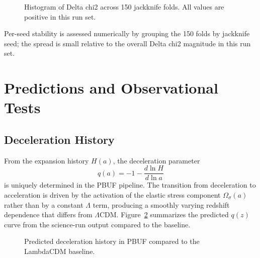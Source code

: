 \documentclass[11pt]{article}
\begin{document}
\begin{figure}[ht]
\centering
{}
\caption{Histogram of Delta chi2 across 150 jackknife folds. All values are positive in this run set.}
\label{fig:deltahist}
\end{figure}

\noindent
Per-seed stability is assessed numerically by grouping the 150 folds by jackknife seed; the spread is small relative to the overall Delta chi2 magnitude in this run set.

    \FloatBarrier

\section{Predictions and Observational Tests}
\subsection{Deceleration History}

From the expansion history \(H(a)\), the deceleration parameter
\begin{equation}
q(a) = -1 - \frac{d\ln H}{d\ln a}
\end{equation}
is uniquely determined in the PBUF pipeline.
The transition from deceleration to acceleration is driven by the activation of the elastic stress component \(\Omega_\sigma(a)\) rather than by a constant \(\Lambda\) term, producing a smoothly varying redshift dependence that differs from \(\Lambda\)CDM.
Figure~\ref{fig:qz_pred} summarizes the predicted \(q(z)\) curve from the science-run output compared to the baseline.

\begin{figure}[ht]
\centering
{}
\caption{Predicted deceleration history in PBUF compared to the LambdaCDM baseline.}
\label{fig:qz_pred}
\end{figure}
\end{document}
